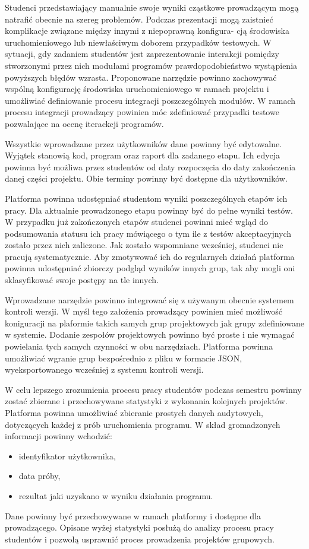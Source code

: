 Studenci przedstawiający manualnie swoje wyniki cząstkowe prowadzącym mogą natrafić obecnie na szereg problemów.
Podczas prezentacji mogą zaistnieć komplikacje związane między innymi z niepoprawną konfigura-
cją środowiska uruchomieniowego lub niewłaściwym doborem przypadków testowych.
W sytuacji, gdy zadaniem studentów jest zaprezentowanie interakcji pomiędzy stworzonymi
przez nich modułami programów prawdopodobieństwo wystąpienia powyższych błędów
wzrasta.
Proponowane narzędzie powinno zachowywać wspólną konfigurację środowiska uruchomieniowego w ramach projektu i umożliwiać definiowanie procesu integracji poszczególnych modułów. 
W ramach procesu integracji prowadzący powinien móc zdefiniować przypadki testowe pozwalające na ocenę iterackcji programów.

Wszystkie wprowadzane przez użytkowników dane powinny być edytowalne.
Wyjątek stanowią kod, program oraz raport dla zadanego etapu.
Ich edycja powinna być możliwa przez studentów od daty rozpoczęcia do daty zakończenia danej części projektu.
Obie terminy powinny być dostępne dla użytkowników.

Platforma powinna udostępniać studentom wyniki poszczególnych etapów ich pracy.
Dla aktualnie prowadzonego etapu powinny być do pełne wyniki testów.
W przypadku już zakończonych etapów studenci powinni mieć wgląd do podsumowania statusu ich pracy mówiącego o tym ile z testów akceptacyjnych zostało przez nich zaliczone.
Jak zostało wspomniane wcześniej, studenci nie pracują systematycznie.
Aby zmotywować ich do regularnych działań platforma powinna udostępniać zbiorczy podgląd wyników innych grup, tak aby mogli oni sklasyfikować swoje postępy na tle innych.

Wprowadzane narzędzie powinno integrować się z używanym obecnie systemem kontroli wersji.
W myśl tego założenia prowadzący powinien mieć możliwość koniguracji na plaformie takich samych grup projektowych jak grupy zdefiniowane w systemie.
Dodanie zespołów projektowych powinno być proste i nie wymagać powielania tych samych czynności w obu narzędziach.
Platforma powinna umożliwiać wgranie grup bezpośrednio z pliku w formacie JSON, wyeksportowanego wcześniej z systemu kontroli wersji.

W celu lepszego zrozumienia procesu pracy studentów podczas semestru powinny zostać zbierane i przechowywane statystyki z wykonania kolejnych projektów.
Platforma powinna umożliwiać zbieranie prostych danych audytowych, dotyczących każdej z prób uruchomienia programu.
W skład gromadzonych informacji powinny wchodzić:
\begin{itemize}
\item identyfikator użytkownika,
\item data próby,
\item rezultat jaki uzyskano w wyniku działania programu.
\end{itemize}
Dane powinny być przechowywane w ramach platformy i dostępne dla prowadzącego.
Opisane wyżej statystyki posłużą do analizy procesu pracy studentów i pozwolą usprawnić proces prowadzenia projektów grupowych.

